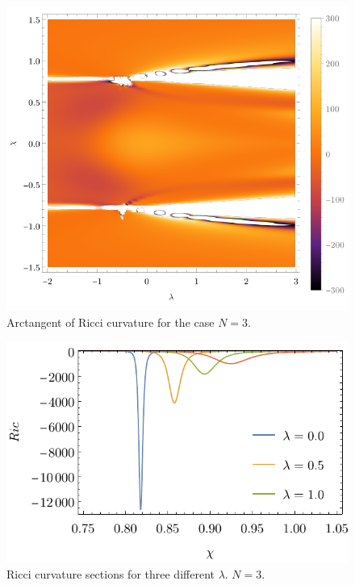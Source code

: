 \begin{figure}[H]
    \centering
    \includegraphics{../img/N=3_Ricci.pdf}
    \caption{Arctangent of Ricci curvature for the case $N=3$.}
    \label{fig:N=3_Ricci}
\end{figure}

\begin{figure}[H]
    \centering
    \includegraphics[scale=0.9]{../img/N=3_Ricci_section.pdf}
    \caption{Ricci curvature sections for three different $\lambda$. $N=3$.}
    \label{fig:N=3_Ricci_section}
\end{figure}


